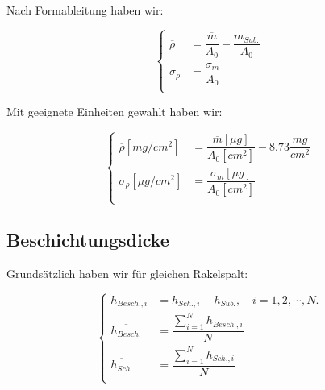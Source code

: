 \documentclass[12pt,UTF8]{article}
\begin{document}
Nach Formableitung haben wir:
\begin{center}
    \begin{equation}
        \left\{
        \begin{aligned}
            \overline{\rho} & =\dfrac{\overline{m}}{A_0}-\dfrac{m_{Sub.}}{A_{0}} \\
            \sigma_{\rho}   & =\dfrac{\sigma_m}{A_0}                             \\
        \end{aligned}
        \right.
    \end{equation}
\end{center}
Mit geeignete Einheiten gewahlt haben wir:
\begin{center}
    \begin{equation}
        \left\{
        \begin{aligned}
            \overline{\rho}[mg/cm^2]  & =\dfrac{\overline{m}[\mu g]}{A_0[cm^2]}-8.73\dfrac{mg}{cm^2} \\
            \sigma_{\rho}[\mu g/cm^2] & =\dfrac{\sigma_m[\mu g]}{A_0[cm^2]}                          \\
        \end{aligned}
        \right.
    \end{equation}
\end{center}

\subsection{Beschichtungsdicke}
Grunds\"atzlich haben wir f\"ur gleichen Rakelspalt:
\begin{center}
    \begin{equation}
        \left\{
        \begin{aligned}
            h_{Besch.,i}          & =h_{Sch.,i}-h_{Sub.},\quad i=1,2,\cdots,N.    \\
            \overline{h_{Besch.}} & =\dfrac{\sum\limits_{i=1}^{N}h_{Besch.,i}}{N} \\
            \overline{h_{Sch.}}   & =\dfrac{\sum\limits_{i=1}^{N}h_{Sch.,i}}{N}   \\
        \end{aligned}
        \right.
    \end{equation}
\end{center}
\end{document}
